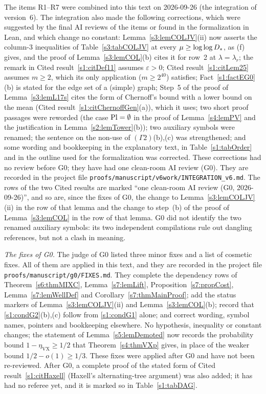 \begin{remark}
\begin{enumerate}
The items R1--R7 were combined into this text on 2026-09-26 (the integration
of version~6). The integration also made the following corrections, which were
suggested by the final AI reviews of the items or found in the formalization in
Lean, and which change no constant: Lemma~\ref{s3:lemCOLJV}(ii) now asserts the
column-3 inequalities of Table~\ref{s3:tabCOLJV} at every
$\mu\ge\log\log D_{*}$, as (f) gives, and the proof of
Lemma~\ref{s3:lemCOL}(b) cites it for row~2 at $\lambda=\lambda_r$; the remark
in Cited result~\ref{s1:citDef11} assumes $\varepsilon>0$; Cited
result~\ref{s1:citLem25} assumes $m\ge2$, which its only application
($m\ge2^{40}$) satisfies; Fact~\ref{s1:factEG0}(b) is stated for the edge set of
a (simple) graph; Step~5 of the proof of Lemma~\ref{s3:lemL17s} cites the form of
Chernoff's bound with a lower bound on the mean (Cited
result~\ref{s1:citChernoffGen}(a)), which it uses; two short proof passages were reworded (the case $\mathrm{Pl}=\emptyset$ in the proof of
Lemma~\ref{s4:lemPV} and the justification in Lemma~\ref{s2:lemTower}(b)); two
auxiliary symbols were renamed; the sentence on the non-use of
$(\Gamma2)$(b),(c) was strengthened; and some wording and bookkeeping in the
explanatory text, in Table~\ref{s1:tabOrder} and in the outline used for the
formalization was corrected. These corrections had no review before G0; they
have had one clean-room AI review (G0). They are recorded in the
project file
\texttt{proofs/\allowbreak{}manuscript/\allowbreak{}v6work/\allowbreak{}INTEGRATION\_v6.md}.
The rows of the two Cited results are marked ``one clean-room AI review (G0,
2026-09-26)'', and so are, since the fixes of G0, the change to
Lemma~\ref{s3:lemCOLJV}(ii) in the row of that lemma and the change to step~(b)
of the proof of Lemma~\ref{s3:lemCOL} in the row of that lemma. G0 did not
identify the two renamed auxiliary symbols: its two independent compilations
rule out dangling references, but not a clash in meaning.

\emph{The fixes of G0.} The judge of G0 listed three minor fixes and a list of
cosmetic fixes. All of them are applied in this text, and they are recorded in
the project file
\texttt{proofs/\allowbreak{}manuscript/\allowbreak{}g0/\allowbreak{}FIXES.md}.
They complete the dependency rows of Theorem~\ref{s6:thmMIXC},
Lemma~\ref{s7:lemLift}, Proposition~\ref{s7:propCost},
Lemma~\ref{s7:lemWellDef} and Corollary~\ref{s7:thmMainProof}; add the status
markers of Lemma~\ref{s3:lemCOLJV}(ii) and Lemma~\ref{s3:lemCOL}(b); record that
\ref{s1:condG2}(b),(c) follow from \ref{s1:condG1} alone; and correct wording,
symbol names, pointers and bookkeeping elsewhere. No hypothesis, inequality or
constant changes; the statement of Lemma~\ref{s5:lemDemoted} now records the
probability bound $1-\eta_{\mathrm{VX}}\ge1/2$ that Theorem~\ref{s4:thmVXp}
gives, in place of the weaker bound $1/2-o(1)\ge1/3$. These fixes were applied
after G0 and have not been re-reviewed. After G0, a complete proof of the
stated form of Cited result~\ref{s1:citHaxell} (Haxell's alternating-tree
argument) was also added; it has had no referee yet, and it is marked so in
Table~\ref{s1:tabDAG}.


\end{enumerate}
\end{remark}
